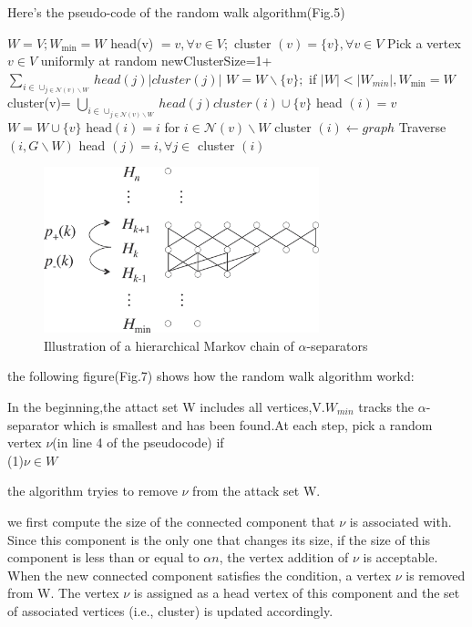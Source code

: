 \documentclass[10pt,journal]{IEEEtran}
\begin{document}
Here's the pseudo-code of the random walk algorithm(Fig.5)
\begin{algorithmic}[1]
	\STATE $W = V ; W _ { \min } = W$
	\STATE head(v) $= v , \forall v \in V ;$ cluster $( v ) = \{ v \} , \forall v \in V$
	\STATE Pick a vertex $v \in V$ uniformly at random
	\STATE newClusterSize=1+$\sum _ { i \in \cup _ { j \in \mathcal { N } ( v ) \backslash W } } { head } ( j )|cluster(j)|$
	\STATE $W = W \backslash \{ v \} ;$ if $| W | < \left| W _ { min } \right| , W _ { \min } = W$
	\STATE cluster(v)= $\bigcup _ { i \in \cup _ { j \in \mathcal { N } ( v ) \backslash W } } { head } ( j )cluster ( i ) \cup \{ v \}$
	\STATE head $( i ) = v$
	\ENDFOR
	\ENDIF
	\STATE $W = W \cup \{ v \}$
	\STATE $\mathrm { head } ( i ) = i$ for $i \in \mathcal { N } ( v ) \backslash W$
	\STATE cluster $( i ) \leftarrow  { graph }$ Traverse $( i , G \backslash W )$
	\STATE head $( j ) = i , \forall j \in$ cluster $( i )$
	\ENDIF
	\ENDFOR
	\ENDIF
	\ENDFOR
\end{algorithmic}
\begin{figure}[htbp]
	\centering
	\includegraphics[width=8cm]{img/m}
	\caption[]{Illustration of a hierarchical Markov chain of $\alpha$-separators}
\end{figure}

the following figure(Fig.7) shows how the random walk algorithm workd:

In the beginning,the attact set W includes all vertices,V.$W_{min}$ tracks the $\alpha$-separator which is smallest and has been found.At each step, pick a random vertex $\nu$(in line 4 of the pseudocode)
if\\
(1)$\nu\in W$ 

the algorithm tryies to remove $\nu$ from the attack set W.

 we first compute the size of
the connected component that $\nu$ is associated with. Since this component
is the only one that changes its size, if the size of this component is
less than or equal to $\alpha n$, the vertex addition of $\nu$ is acceptable. When the
new connected component satisfies the condition, a vertex $\nu$ is removed
from W. The vertex $\nu$ is assigned as a head vertex of this component and
the set of associated vertices (i.e., cluster) is updated accordingly.
\end{document}
